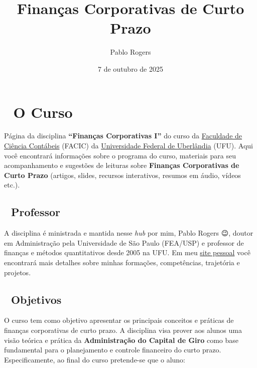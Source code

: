 \documentclass[
  a4paper,
]{book}
\title{Finanças Corporativas de Curto Prazo}
\author{Pablo Rogers}
\date{7 de outubro de 2025}
\renewcommand*\contentsname{Índice}
\newcommand\contentsname{Índice}
\begin{document}
\frontmatter
\maketitle

\renewcommand*\contentsname{Índice}
{
\hypersetup{linkcolor=}
\setcounter{tocdepth}{2}
\tableofcontents
}

\mainmatter
{}

\chapter*{🏢 O Curso}\label{sec-home}


Página da disciplina \textbf{``Finanças Corporativas I''} do curso da
\href{https://www.facic.ufu.br/}{Faculdade de Ciência Contábeis} (FACIC)
da \href{https://ufu.br/}{Universidade Federal de Uberlândia} (UFU).
Aqui você encontrará informações sobre o programa do curso, materiais
para seu acompanhamento e sugestões de leituras sobre \textbf{Finanças
Corporativas de Curto Prazo} (artigos, slides, recursos interativos,
resumos em áudio, vídeos etc.).

\section*{🧠 Professor}\label{sec-instrutor}


A disciplina é ministrada e mantida nesse \emph{hub} por mim, Pablo
Rogers 😉, doutor em Administração pela Universidade de São Paulo
(FEA/USP) e professor de finanças e métodos quantitativos desde 2005 na
UFU. Em meu \href{https://phdpablo.com/}{site pessoal} você encontrará
mais detalhes sobre minhas formações, competências, trajetória e
projetos.

\section*{🎯 Objetivos}\label{sec-about}


O curso tem como objetivo apresentar os principais conceitos e práticas
de finanças corporativas de curto prazo. A disciplina visa prover aos
alunos uma visão teórica e prática da \textbf{Administração do Capital
de Giro} como base fundamental para o planejamento e controle financeiro
do curto prazo. Especificamente, ao final do curso pretende-se que o
aluno:
\end{document}
